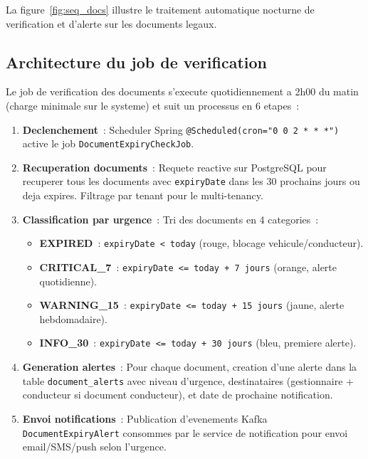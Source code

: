 \documentclass[12pt,a4paper]{report}
\begin{document}
\begin{enumerate}[leftmargin=2cm]
La figure~\ref{fig:seq_docs} illustre le traitement automatique
nocturne de verification et d'alerte sur les documents legaux.

\subsection{Architecture du job de verification}

Le job de verification des documents s'execute quotidiennement a 2h00 du matin
(charge minimale sur le systeme) et suit un processus en 6 etapes~:

\begin{enumerate}[leftmargin=2cm]
  \item \textbf{Declenchement}~: Scheduler Spring \texttt{@Scheduled(cron="0 0 2 * * *")}
        active le job \texttt{DocumentExpiryCheckJob}.
        
  \item \textbf{Recuperation documents}~: Requete reactive sur PostgreSQL
        pour recuperer tous les documents avec \texttt{expiryDate} dans
        les 30 prochains jours ou deja expires. Filtrage par tenant pour
        le multi-tenancy.
        
  \item \textbf{Classification par urgence}~: Tri des documents en 4 categories~:
        \begin{itemize}
          \item \textbf{EXPIRED}~: \texttt{expiryDate < today} (rouge, blocage vehicule/conducteur).
          \item \textbf{CRITICAL\_7}~: \texttt{expiryDate <= today + 7 jours} (orange, alerte quotidienne).
          \item \textbf{WARNING\_15}~: \texttt{expiryDate <= today + 15 jours} (jaune, alerte hebdomadaire).
          \item \textbf{INFO\_30}~: \texttt{expiryDate <= today + 30 jours} (bleu, premiere alerte).
        \end{itemize}
        
  \item \textbf{Generation alertes}~: Pour chaque document, creation d'une
        alerte dans la table \texttt{document\_alerts} avec niveau d'urgence,
        destinataires (gestionnaire + conducteur si document conducteur),
        et date de prochaine notification.
        
  \item \textbf{Envoi notifications}~: Publication d'evenements Kafka
        \texttt{DocumentExpiryAlert} consommes par le service de notification
        pour envoi email/SMS/push selon l'urgence.
        

\end{enumerate}
\end{enumerate}
\end{document}
